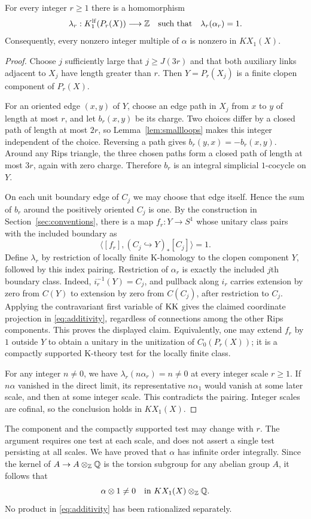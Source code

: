 \begin{proposition}\label{prop:persistence}
For every integer $r\ge1$ there is a homomorphism
\[
 \lambda_r:K_1^{\mathrm{lf}}(P_r(X))\longrightarrow\mathbb Z
 \quad\text{such that}\quad \lambda_r(\alpha_r)=1.
\]
Consequently, every nonzero integer multiple of $\alpha$ is nonzero in
$KX_1(X)$.
\end{proposition}
\begin{proof}
Choose $j$ sufficiently large that $j\ge J(3r)$ and that both auxiliary
links adjacent to $X_j$ have length greater than $r$. Then $Y=P_r(X_j)$ is
a finite clopen component of $P_r(X)$.

For an oriented edge $(x,y)$ of $Y$, choose an edge path in $X_j$ from $x$
to $y$ of length at most $r$, and let $b_r(x,y)$ be its charge. Two choices
differ by a closed path of length at most $2r$, so
Lemma~\ref{lem:smallloops} makes this integer independent of the choice.
Reversing a path gives $b_r(y,x)=-b_r(x,y)$. Around any Rips triangle, the
three chosen paths form a closed path of length at most $3r$, again with
zero charge. Therefore $b_r$ is an integral simplicial $1$-cocycle on $Y$.

On each unit boundary edge of $C_j$ we may choose that edge itself. Hence
the sum of $b_r$ around the positively oriented $C_j$ is one. By the
construction in Section~\ref{sec:conventions}, there is a map
$f_r:Y\to S^1$ whose unitary class pairs with the included boundary as
\[
 \langle[f_r],(C_j\hookrightarrow Y)_*[C_j]\rangle=1.
\]
Define $\lambda_r$ by restriction of locally finite K-homology to the
clopen component $Y$, followed by this index pairing. Restriction of
$\alpha_r$ is exactly the included $j$th boundary class. Indeed,
$i_r^{-1}(Y)=C_j$, and pullback along $i_r$ carries extension by zero from
$C(Y)$ to extension by zero from $C(C_j)$, after restriction to $C_j$.
Applying the contravariant first variable of $\operatorname{KK}$ gives the claimed
coordinate projection in \eqref{eq:additivity}, regardless of connections
among the other Rips components. This proves the displayed claim.
Equivalently, one may extend $f_r$ by $1$ outside $Y$ to obtain a
unitary in the unitization of $C_0(P_r(X))$; it is a compactly supported
K-theory test for the locally finite class.

For any integer $n\ne0$, we have $\lambda_r(n\alpha_r)=n\ne0$ at every
integer scale $r\ge1$. If $n\alpha$ vanished in the direct limit, its
representative $n\alpha_1$ would vanish at some later scale, and then at
some integer scale. This contradicts the pairing. Integer scales are
cofinal, so the conclusion holds in $KX_1(X)$.
\end{proof}

The component and the compactly supported test may change with $r$. The
argument requires one test at each scale, and does not assert a single
test persisting at all scales. We have proved that $\alpha$ has infinite
order integrally. Since the kernel of $A\to A\otimes_{\mathbb Z}\mathbb Q$ is the
torsion subgroup for any abelian group $A$, it follows that
\begin{equation}\label{eq:rationalnonzero}
 \alpha\otimes1\ne0\quad\text{in }KX_1(X)\otimes_{\mathbb Z}\mathbb Q.
\end{equation}
No product in \eqref{eq:additivity} has been rationalized separately.
